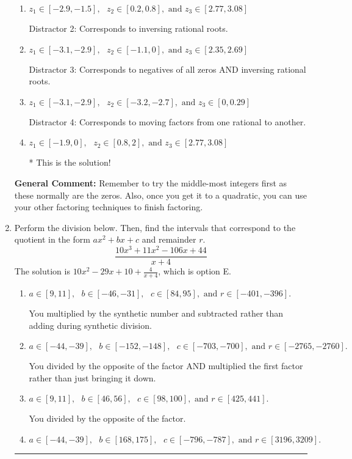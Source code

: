 \documentclass{extbook}[14pt]
\newcommand{\litem}[1]{\item #1

\rule{\textwidth}{0.4pt}}
\begin{document}
\begin{enumerate}
{\begin{enumerate}[label=\Alph*.]
 Distractor 1: Corresponds to negatives of all zeros.
\item \( z_1 \in [-2.9, -1.5], \text{   }  z_2 \in [0.2, 0.8], \text{   and   } z_3 \in [2.77, 3.08] \)

 Distractor 2: Corresponds to inversing rational roots.
\item \( z_1 \in [-3.1, -2.9], \text{   }  z_2 \in [-1.1, 0], \text{   and   } z_3 \in [2.35, 2.69] \)

 Distractor 3: Corresponds to negatives of all zeros AND inversing rational roots.
\item \( z_1 \in [-3.1, -2.9], \text{   }  z_2 \in [-3.2, -2.7], \text{   and   } z_3 \in [0, 0.29] \)

 Distractor 4: Corresponds to moving factors from one rational to another.
\item \( z_1 \in [-1.9, 0], \text{   }  z_2 \in [0.8, 2], \text{   and   } z_3 \in [2.77, 3.08] \)

* This is the solution!
\end{enumerate}

\textbf{General Comment:} Remember to try the middle-most integers first as these normally are the zeros. Also, once you get it to a quadratic, you can use your other factoring techniques to finish factoring.
}
\litem{
Perform the division below. Then, find the intervals that correspond to the quotient in the form $ax^2+bx+c$ and remainder $r$.
\[ \frac{10x^{3} +11 x^{2} -106 x + 44}{x + 4} \]The solution is \( 10x^{2} -29 x + 10 + \frac{4}{x + 4} \), which is option E.\begin{enumerate}[label=\Alph*.]
\item \( a \in [9, 11], \text{   } b \in [-46, -31], \text{   } c \in [84, 95], \text{   and   } r \in [-401, -396]. \)

 You multiplied by the synthetic number and subtracted rather than adding during synthetic division.
\item \( a \in [-44, -39], \text{   } b \in [-152, -148], \text{   } c \in [-703, -700], \text{   and   } r \in [-2765, -2760]. \)

 You divided by the opposite of the factor AND multiplied the first factor rather than just bringing it down.
\item \( a \in [9, 11], \text{   } b \in [46, 56], \text{   } c \in [98, 100], \text{   and   } r \in [425, 441]. \)

 You divided by the opposite of the factor.
\item \( a \in [-44, -39], \text{   } b \in [168, 175], \text{   } c \in [-796, -787], \text{   and   } r \in [3196, 3209]. \)


\end{enumerate}}
\end{enumerate}
\end{document}
